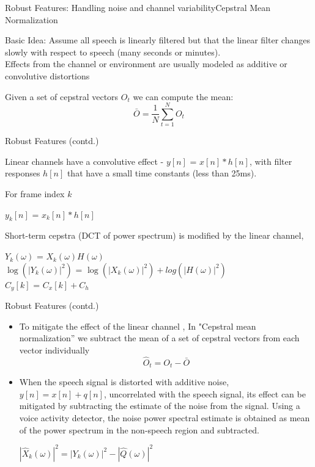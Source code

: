 \begin{frame}{Robust Features: Handling noise and channel variability}{Cepstral Mean Normalization}

Basic Idea: Assume all speech is linearly filtered but that the linear filter changes slowly with respect to speech (many seconds or minutes). \\

Effects from the channel or environment are usually modeled as \alert{additive or convolutive
distortions}

Given a set of cepstral vectors $O_{t}$ we can compute the mean:
\[ \bar{O} = \frac{1}{N}\sum_{t=1}^{N} O_t \]

\end{frame}

\begin{frame}{Robust Features (contd.)}


Linear channels have a convolutive effect - $y[n]$ = $x[n]*h[n]$, with
filter responses $h[n]$ that have a \alert{small time constants (less than 25ms)}. 

For frame index $k$
\begin{center}
$y_k[n]$ = $x_k[n]*h[n]$
\end{center}
Short-term cepstra (DCT of power spectrum) is modified by the linear channel,
\begin{center}
$Y_k(\omega)$ = $X_k(\omega)H(\omega)$\\
$\log(|Y_k(\omega)|^2)$ = $\log(|X_k(\omega)|^2)+log(|H(\omega)|^2)$\\
$C_y[k]$ = $C_x[k] + C_h$
\end{center}

\end{frame}

\begin{frame}{Robust Features (contd.)}
\begin{itemize}
\item To mitigate the effect of the linear  channel , In "Cepstral mean normalization'' we subtract the mean of a set of cepstral vectors from each vector individually
\[ \hat{O}_t = O_t-\bar{O} \]

\item When the speech signal is distorted with additive noise,  $y[n] = x[n] + q[n]$, uncorrelated with the speech signal, its effect can be mitigated by \alert{subtracting the estimate of the noise} from the signal.
Using a voice activity detector, the noise power spectral estimate is obtained as \alert{mean of the power spectrum in the non-speech region} and subtracted.
       \begin{center}
                $|\hat{X}_k(\omega)|^2 = |Y_k(\omega)|^2 - |\hat{Q}(\omega)|^2$
        \end{center}
\end{itemize}
\end{frame}

